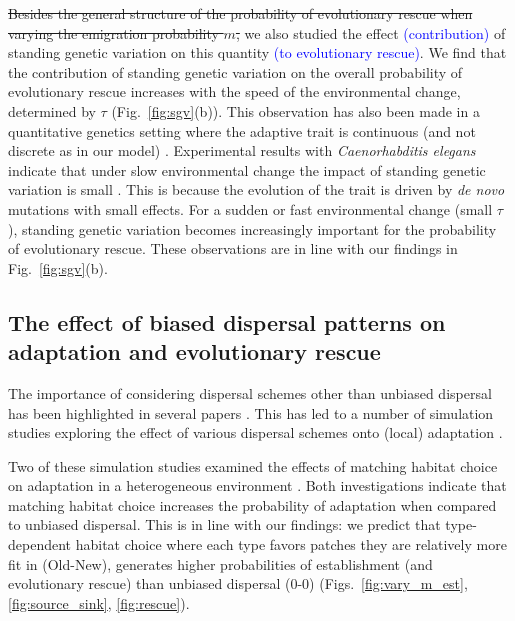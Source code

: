 \documentclass[11pt]{article}
\newcommand{\francois}[1]{\textcolor{blue}{(#1)}}
\newcommand{\chg}[1]{\textcolor{change}{#1}}
\begin{document}
\st{Besides the general structure of the probability of evolutionary rescue when varying the emigration probability $m$, }we also studied the effect \francois{contribution} of standing genetic variation on this quantity \francois{to evolutionary rescue}. 
We find that the contribution of standing genetic variation on the overall probability of evolutionary rescue increases with the speed of the environmental change, determined by $\tau$ (Fig.~\ref{fig:sgv}(b)). 
This observation has also been made in a quantitative genetics setting where the adaptive trait is continuous (and not discrete as in our model) \citep{matuszewski_2015}. Experimental results with \textit{Caenorhabditis elegans} indicate that under slow environmental change the impact of standing genetic variation is small \citep{guzella_2018}. This is because the evolution of the trait is driven by \textit{de novo} mutations with small effects. For a sudden or fast environmental change (small $\tau$), standing genetic variation becomes increasingly important for the probability of evolutionary rescue. These observations are in line with our findings in Fig.~\ref{fig:sgv}(b). %

\subsection*{The effect of \chg{biased} dispersal patterns on adaptation and evolutionary rescue}
The importance of considering dispersal schemes \chg{other than} \chg{unbiased} dispersal has been highlighted in several papers \citep{edelaar_2008,clobert_2009,edelaar_2012}. This has led to a number of simulation studies exploring the effect of various dispersal schemes onto \chg{(local)} adaptation %
\citep[e.g.][]{vuilleumier_2010,holt_2015,mortier_2018,pellerin_2018}. 

Two of these simulation studies examined the effects of matching habitat choice on adaptation \chg{in} a heterogeneous environment \citep{vuilleumier_2010,holt_2015}. Both investigations indicate that matching habitat choice increases the probability of adaptation when compared to \chg{unbiased} dispersal. 
This is in line with our findings: we predict that type-dependent habitat choice \chg{where each type favors patches they are relatively more fit in (Old-New),} generates higher probabilities of establishment \chg{(}and evolutionary rescue\chg{)} than \chg{unbiased} dispersal \chg{(0-0)} (Figs.~\ref{fig:vary_m_est}, \ref{fig:source_sink}, \ref{fig:rescue}). 
\end{document}
